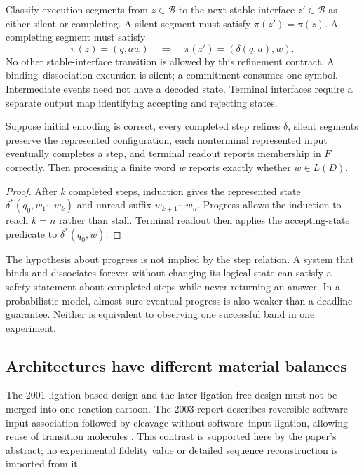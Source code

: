 \begin{definition}
Classify execution segments from $z\in\mathcal B$ to the next stable
interface $z'\in\mathcal B$ as either silent or completing. A silent segment
must satisfy $\pi(z')=\pi(z)$. A completing segment must satisfy
\[
 \pi(z)=(q,aw)\quad\Longrightarrow\quad
 \pi(z')=(\delta(q,a),w).
\]
No other stable-interface transition is allowed by this refinement contract.
A binding--dissociation excursion is silent; a commitment consumes one symbol.
Intermediate events need not have a decoded state. Terminal interfaces require
a separate output map identifying accepting and rejecting states.
\end{definition}


\begin{proposition}
Suppose initial encoding is correct, every completed step refines $\delta$,
silent segments preserve the represented configuration,
each nonterminal represented input eventually completes a step, and terminal
readout reports membership in $F$ correctly. Then processing a finite word
$w$ reports exactly whether $w\in L(D)$.
\end{proposition}
\begin{proof}
After $k$ completed steps, induction gives the represented state
$\delta^*(q_0,w_1\cdots w_k)$ and unread suffix $w_{k+1}\cdots w_n$.
Progress allows the induction to reach $k=n$ rather than stall. Terminal
readout then applies the accepting-state predicate to $\delta^*(q_0,w)$.
\end{proof}
The hypothesis about progress is not implied by the step relation. A system
that binds and dissociates forever without changing its logical state can
satisfy a safety statement about completed steps while never returning an
answer. In a probabilistic model, almost-sure eventual progress is also
weaker than a deadline guarantee. Neither is equivalent to observing one
successful band in one experiment.

\subsection{Architectures have different material balances}
The 2001 ligation-based design and the later ligation-free design must not
be merged into one reaction cartoon. The 2003 report describes reversible
software--input association followed by cleavage without software--input
ligation, allowing reuse of transition molecules \cite{Benenson2003}. This contrast
is supported here by the paper's abstract; no experimental fidelity value
or detailed sequence reconstruction is imported from it.

